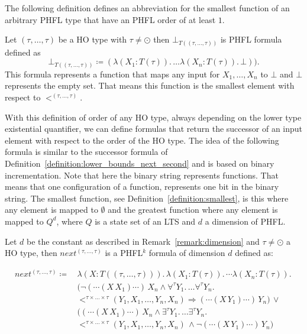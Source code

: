The following definition defines an abbreviation for the smallest function of an arbitrary PHFL type that have an PHFL order of at least $1$.

\begin{definition} 
\label{definition:smallest}
	Let $(\tau, \dots, \tau)$ be a HO type with $\tau \neq \odot$ then $\bot_{T((\tau, \dots, \tau))}$ is PHFL formula defined as
	\[\bot_{T((\tau, \dots, \tau))} \coloneqq (\lambda (X_1 \colon T(\tau)).\, \dots \lambda (X_n \colon T(\tau)).\,\bot)).\] 
    This formula represents a function that maps any input for $X_1, \dots, X_n$ to $\bot$ and $\bot$ 
    represents the empty set. That means this function is the smallest element with respect to $<^{(\tau, \dots, \tau)}$.
\end{definition}

With this definition of order of any HO type, always depending on the lower type existential quantifier, we can define
formulas that return the successor of an input element with respect to the order of the HO type. The idea of the
following formula is similar to the successor formula of Definition~\ref{definition:lower_bounds_next_second} and is
based on binary incrementation. Note that here the binary string represents functions. That means that one configuration of a function, represents one bit in the binary string. The smallest function, see Definition~\ref{definition:smallest}, is this where any element is mapped to $\emptyset$ and the greatest function where any element is mapped to $Q^d$, where $Q$ is a state set of an LTS and $d$ a dimension of PHFL. 

\begin{definition}
    \label{definition:lower_bounds_next_higher}
    Let $d$ be the constant as described in Remark~\ref{remark:dimension} and $\tau \neq \odot$ a
    HO type, then $next^{(\tau, \dots, \tau)}$ is a PHFL$^k$ formula of dimension $d$ defined as:

    \begin{align*}
        next^{(\tau, \dots, \tau)} \coloneqq &\,\lambda (X \colon T ((\tau, \dots, \tau))).\,\lambda (X_1 \colon T(\tau)).\, \dotsb \lambda (X_n \colon T(\tau)).\, \\&\,
        \big(\neg (\dotsb(X\,X_1)\dotsb)\,X_n \wedge \forall^{\tau}Y_1.\, \dots \forall^{\tau}Y_n.\,\\&\,<^{\tau \times
        \dots \times \tau}(Y_1, X_1, \dots, Y_n, X_n) \Rightarrow  (\dotsb(X\,Y_1)\dotsb)\,Y_n\big) \,\vee
        \\&\,\big((\dotsb (X\,X_1) \dotsb)\,X_n \wedge \exists^{\tau}Y_1.\, \dots \exists^{\tau}Y_n.\, \\&\,
        <^{\tau \times \dots \times \tau}
        (Y_1, X_1, \dots, Y_n, X_n)\,\wedge \neg (\dotsb(X\,Y_1)\dotsb)\,Y_n\big)
    \end{align*}
\end{definition}

